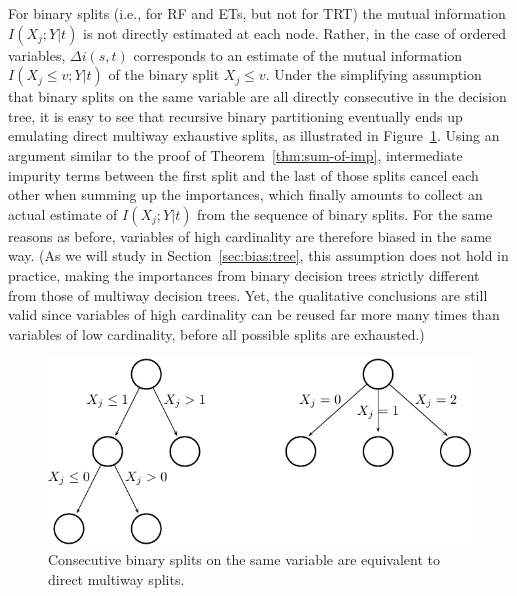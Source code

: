For binary splits (i.e., for RF and ETs, but not for TRT) the mutual
information $I(X_j;Y|t)$ is not directly estimated at each node. Rather, in the
case of ordered variables, $\Delta i(s, t)$ corresponds to an estimate of the
mutual information $I(X_j\leq v;Y|t)$ of the binary split $X_j \leq v$. Under
the simplifying assumption that binary splits on the same variable are all
directly consecutive in the decision tree,  it is easy to see that recursive
binary partitioning eventually ends up emulating direct multiway exhaustive
splits, as illustrated in Figure~\ref{fig:7:splits}. Using an argument similar
to the proof of Theorem~\ref{thm:sum-of-imp}, intermediate impurity terms
between the first split and the last of those splits cancel each other when
summing up the importances, which finally amounts to collect an actual estimate
of $I(X_j;Y|t)$ from the sequence of binary splits. For the same reasons as before,
variables of high cardinality are therefore biased in the same way. (As we will
study in Section~\ref{sec:bias:tree}, this assumption does not hold in
practice, making the importances from binary decision trees strictly different
from those of multiway decision trees. Yet, the qualitative conclusions are
still valid since variables of high cardinality can be reused far more many
times than variables of low cardinality, before all possible splits are
exhausted.)

\begin{figure}
    \centering
    \includegraphics[scale=1.0]{figures/ch7_splits.pdf}
    \caption{Consecutive binary splits on the same variable are equivalent to direct multiway splits.}
    \label{fig:7:splits}
\end{figure}

